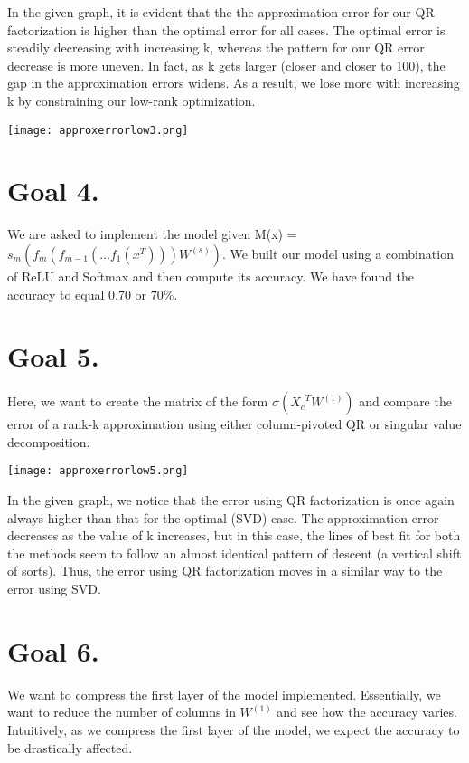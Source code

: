\documentclass[12pt]{article}
\begin{document}
In the given graph, it is evident that the the approximation error for our QR factorization is higher than the optimal error for all cases. The optimal error is steadily decreasing with increasing k, whereas the pattern for our QR error decrease is more uneven. In fact, as k gets larger (closer and closer to 100), the gap in the approximation errors widens. As a result, we lose more with increasing k by constraining our low-rank optimization.

\begin{center}
    \texttt{[image: approxerrorlow3.png]}
\end{center}

\section*{Goal 4.}
We are asked to implement the model given M(x) = $s_m ( f_m \left( f_{m-1} \left( \dots f_1 \left( x^T \right) \right) \right) W^{(s)} )$.
We built our model using a combination of ReLU and Softmax and then compute its accuracy. We have found the accuracy to equal 0.70 or $70\%$.

\section*{Goal 5.}
Here, we want to create the matrix of the form $\sigma ( {X_c}^T W^{(1)})$ and compare the error of a rank-k approximation using either column-pivoted QR or singular value decomposition.

\begin{center}
    \texttt{[image: approxerrorlow5.png]}
\end{center}
In the given graph, we notice that the error using QR factorization is once again always higher than that for the optimal (SVD) case. The approximation error decreases as the value of k increases, but in this case, the lines of best fit for both the methods seem to follow an almost identical pattern of descent (a vertical shift of sorts). Thus, the error using QR factorization moves in a similar way to the error using SVD.

\section*{Goal 6.}
We want to compress the first layer of the model implemented. Essentially, we want to reduce the number of columns in $W^{(1)}$ and see how the accuracy varies.
Intuitively, as we compress the first layer of the model, we expect the accuracy to be drastically affected.
\end{document}
